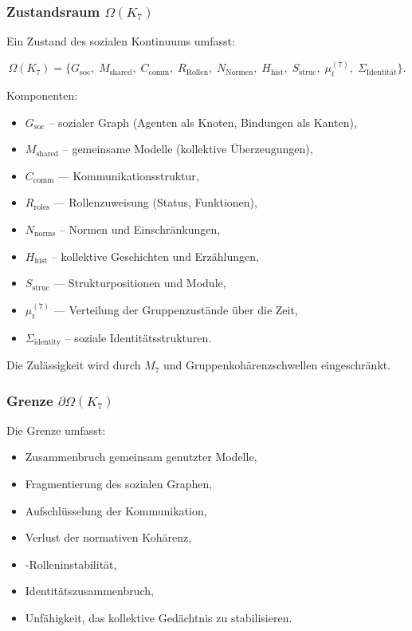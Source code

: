 \subsubsection{Zustandsraum \texorpdfstring{$\Omega(K_7)$}{\Omega(K_7)}}

Ein Zustand des sozialen Kontinuums umfasst:

\[
\Omega(K_7)=
\{
G_{\mathrm{soc}},\;
M_{\mathrm{shared}},\;
C_{\mathrm{comm}},\;
R_{\mathrm{Rollen}},\;
N_{\mathrm{Normen}},\;
H_{\mathrm{hist}},\;
S_{\mathrm{struc}},\;
\mu^{(7)}_t,\;
\Sigma_{\mathrm{Identität}}
\}.
\]

Komponenten:
\begin{itemize}
    \item $G_{\mathrm{soc}}$ – sozialer Graph (Agenten als Knoten, Bindungen als Kanten),
    \item $M_{\mathrm{shared}}$ – gemeinsame Modelle (kollektive Überzeugungen),
    \item $C_{\mathrm{comm}}$ — Kommunikationsstruktur,
    \item $R_{\mathrm{roles}}$ — Rollenzuweisung (Status, Funktionen),
    \item $N_{\mathrm{norms}}$ – Normen und Einschränkungen,
    \item $H_{\mathrm{hist}}$ – kollektive Geschichten und Erzählungen,
    \item $S_{\mathrm{struc}}$ — Strukturpositionen und Module,
    \item $\mu^{(7)}_t$ — Verteilung der Gruppenzustände über die Zeit,
    \item $\Sigma_{\mathrm{identity}}$ – soziale Identitätsstrukturen.
\end{itemize}

Die Zulässigkeit wird durch $M_7$ und Gruppenkohärenzschwellen eingeschränkt.

\subsubsection{Grenze \texorpdfstring{$\partial\Omega(K_7)$}{\partial\Omega(K_7)}}

Die Grenze umfasst:
\begin{itemize}
    \item Zusammenbruch gemeinsam genutzter Modelle,
    \item Fragmentierung des sozialen Graphen,
    \item Aufschlüsselung der Kommunikation,
    \item Verlust der normativen Kohärenz,
    \item-Rolleninstabilität,
    \item Identitätszusammenbruch,
    \item Unfähigkeit, das kollektive Gedächtnis zu stabilisieren.
\end{itemize}

